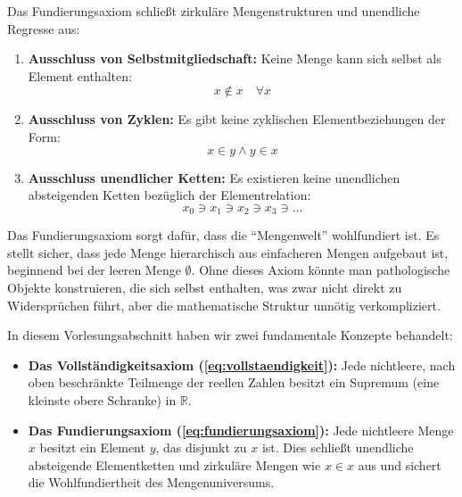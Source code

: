 \begin{math-stroke}

\begin{explanation-of-steps}
Das Fundierungsaxiom schließt zirkuläre Mengenstrukturen und unendliche Regresse aus:
\begin{enumerate}[label=\textbf{(\roman*)}]
    \item \textbf{Ausschluss von Selbstmitgliedschaft:} Keine Menge kann sich selbst als Element enthalten:
    \[
    x \notin x \quad \forall x
    \]
    \item \textbf{Ausschluss von Zyklen:} Es gibt keine zyklischen Elementbeziehungen der Form:
    \[
    x \in y \land y \in x
    \]
    \item \textbf{Ausschluss unendlicher Ketten:} Es existieren keine unendlichen absteigenden Ketten bezüglich der Elementrelation:
    \[
    x_0 \ni x_1 \ni x_2 \ni x_3 \ni \dots
    \]
\end{enumerate}
\end{explanation-of-steps}
\end{math-stroke}

\begin{didactic-insight}
Das Fundierungsaxiom sorgt dafür, dass die "`Mengenwelt"' wohlfundiert ist. Es stellt sicher, dass jede Menge hierarchisch aus einfacheren Mengen aufgebaut ist, beginnend bei der leeren Menge $\emptyset$. Ohne dieses Axiom könnte man pathologische Objekte konstruieren, die sich selbst enthalten, was zwar nicht direkt zu Widersprüchen führt, aber die mathematische Struktur unnötig verkompliziert.
\end{didactic-insight}

\begin{nice-box}
In diesem Vorlesungsabschnitt haben wir zwei fundamentale Konzepte behandelt:
\begin{itemize}
    \item \textbf{Das Vollständigkeitsaxiom (\eqref{eq:vollstaendigkeit}):} Jede nichtleere, nach oben beschränkte Teilmenge der reellen Zahlen besitzt ein Supremum (eine kleinste obere Schranke) in $\mathbb{R}$.
    \item \textbf{Das Fundierungsaxiom (\eqref{eq:fundierungsaxiom}):} Jede nichtleere Menge $x$ besitzt ein Element $y$, das disjunkt zu $x$ ist. Dies schließt unendliche absteigende Elementketten und zirkuläre Mengen wie $x \in x$ aus und sichert die Wohlfundiertheit des Mengenuniversums.
\end{itemize}
\end{nice-box}

